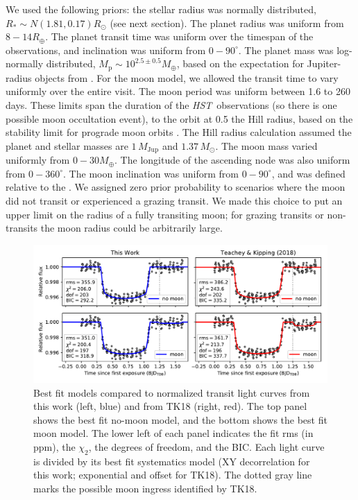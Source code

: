\documentclass[twocolumn,trackchanges]{aastex62}
\newcommand{\project}[1]{\textsl{#1}}
\newcommand{\HST}{\project{HST}}
\begin{document}
We used the following priors: the stellar radius was normally distributed, $R_* \sim N(1.81, 0.17) R_\odot$ (see next section). The planet radius was uniform from $8 - 14R_\oplus$. The planet transit time was uniform over the timespan of the observations, and inclination was uniform from $0 - 90^\circ$.  The planet mass was log-normally distributed, $M_\mathrm{p} \sim 10^{2.5 \pm 0.5} M_\oplus$, based on the expectation for Jupiter-radius objects from \cite{ning18}.  For the moon model, we allowed the transit time to vary uniformly over the entire visit. The moon period was uniform between 1.6 to 260 days. These limits span the duration of the \HST\ observations (so there is one possible moon occultation event), to the orbit at 0.5 the Hill radius, based on the stability limit for prograde moon orbits \citep{domingos06}. The Hill radius calculation assumed the planet and stellar masses are $1\,M_\mathrm{Jup}$ and $1.37\,M_\odot$.  The moon mass varied uniformly from $0 - 30 M_\oplus$. The longitude of the ascending node was also uniform from $0 - 360^\circ$.  The moon inclination was uniform from $0 - 90^\circ$,  and was defined relative to the .  We assigned zero prior probability to scenarios where the moon did not transit or experienced a grazing transit. We made this choice to put an upper limit on the radius of a fully transiting moon; for grazing transits or non-transits the moon radius could be arbitrarily large.




\begin{figure}
\includegraphics[width = 1.0 \textwidth]{fig3_bestfits.pdf}
    \caption{Best fit models compared to normalized transit light curves from this work (left, blue) and from TK18 (right, red). The top panel shows the best fit no-moon model, and the bottom shows the best fit moon model. The lower left of each panel indicates the fit rms (in ppm), the $\chi_2$, the degrees of freedom, and the BIC.  Each light curve is divided by its best fit systematics model (XY decorrelation for this work; exponential and offset for TK18).  The dotted gray line marks the possible moon ingress identified by TK18.}
\label{fig:bestfit}
\end{figure}
\end{document}
